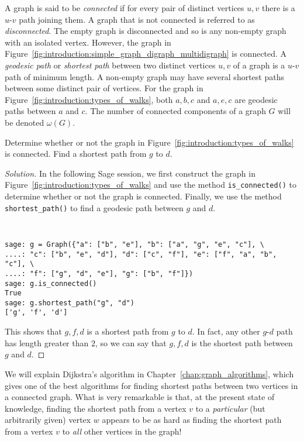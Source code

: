 A graph is said to be \emph{connected} if for every pair of distinct
vertices $u, v$ there is a $u$-$v$ path joining them. A graph that is
not connected is referred to as \emph{disconnected}. The empty graph
is disconnected and so is any non-empty graph with an isolated
vertex. However, the graph in
Figure~\ref{fig:introduction:simple_graph_digraph_multidigraph} is
connected. A \emph{geodesic path} or \emph{shortest path} between two
distinct vertices $u,v$ of a graph is a $u$-$v$ path of minimum
length. A non-empty graph may have several shortest paths between some
distinct pair of vertices. For the graph in
Figure~\ref{fig:introduction:types_of_walks}, both $a,b,c$ and $a,e,c$
are geodesic paths between $a$ and $c$. The number of connected
components of a graph $G$ will be denoted $\omega(G)$.
\index{$\omega$}

\begin{example}
Determine whether or not the graph in
Figure~\ref{fig:introduction:types_of_walks} is connected. Find a
shortest path from $g$ to $d$.
\end{example}

\begin{proof}[Solution]
In the following Sage session, we first construct the graph in
Figure~\ref{fig:introduction:types_of_walks} and use the method
\verb!is_connected()! to determine whether or not the graph is
connected. Finally, we use the method \verb!shortest_path()! to find
a geodesic path between $g$ and $d$.
%
\begin{center}
\fontsize{9pt}{9pt}
\selectfont
\tt
\begin{lstlisting}
sage: g = Graph({"a": ["b", "e"], "b": ["a", "g", "e", "c"], \
....: "c": ["b", "e", "d"], "d": ["c", "f"], "e": ["f", "a", "b", "c"], \
....: "f": ["g", "d", "e"], "g": ["b", "f"]})
sage: g.is_connected()
True
sage: g.shortest_path("g", "d")
['g', 'f', 'd']
\end{lstlisting}
\end{center}
%
This shows that $g, f, d$ is a shortest path from $g$ to $d$. In fact,
any other $g$-$d$ path has length greater than $2$, so we can say that
$g, f, d$ is the shortest path between $g$ and $d$.
\end{proof}

We will explain Dijkstra's algorithm in
Chapter~\ref{chap:graph_algorithms}, which gives one of the best
algorithms for finding shortest paths between two vertices in a
connected graph. What is very remarkable is that, at the present state
of knowledge, finding the shortest path from a vertex $v$ to a
\emph{particular} (but arbitrarily given) vertex $w$ appears to be as
hard as finding the shortest path from a vertex $v$ to \emph{all}
other vertices in the graph!
\index{Dijkstra's algorithm}


